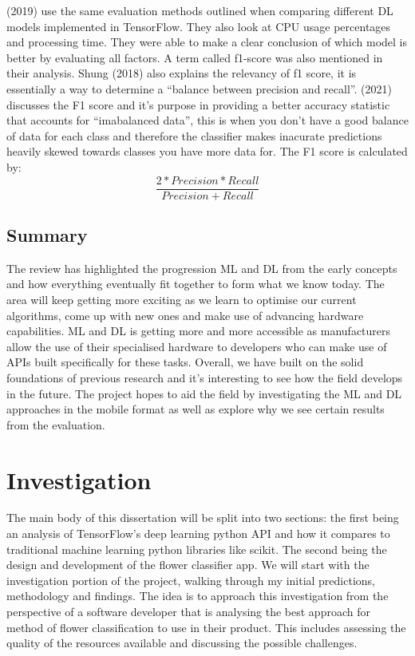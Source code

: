\documentclass{article}
\begin{document}
\par

\citeauthor{Chockwanich} (2019) use the same evaluation methods outlined when comparing different DL models 
implemented in TensorFlow. They also look at CPU usage percentages and processing time. They were able to make a clear 
conclusion of which model is better by evaluating all factors. A term called f1-score was also mentioned in their 
analysis. Shung (2018) also explains the relevancy of f1 score, it is essentially a way to determine a “balance between
precision and recall”. \citeauthor{kors2021} (2021) discusses the F1 score and it's purpose in providing a better 
accuracy statistic that accounts for “imabalanced data”, this is when you don't have a good balance of data for each 
class and therefore the classifier makes inacurate predictions heavily skewed towards classes you have more data for. 
The F1 score is calculated by:
\[\frac{2*Precision*Recall}{Precision + Recall}\]

\subsection{Summary}

The review has highlighted the progression ML and DL from the early concepts and how everything eventually fit 
together to form what we know today. The area will keep getting more exciting as we learn to optimise our current 
algorithms, come up with new ones and make use of advancing hardware capabilities. ML and DL is getting more and more 
accessible as manufacturers allow the use of their specialised hardware to developers who can make use of APIs built 
specifically for these tasks. Overall, we have built on the solid foundations of previous research and it's interesting 
to see how the field develops in the future. The project hopes to aid the field by investigating the ML and DL 
approaches in the mobile format as well as explore why we see certain results from the evaluation.

\section{Investigation}

The main body of this dissertation will be split into two sections: the first being an analysis of TensorFlow's deep 
learning python API and how it compares to traditional machine learning python libraries like scikit. The second being 
the design and development of the flower classifier app. We will start with the investigation portion of the project,
walking through my initial predictions, methodology and findings. The idea is to approach this investigation from the 
perspective of a software developer that is analysing the best approach for method of flower classification to use in 
their product. This includes assessing the quality of the resources available and discussing the possible challenges.
\end{document}
